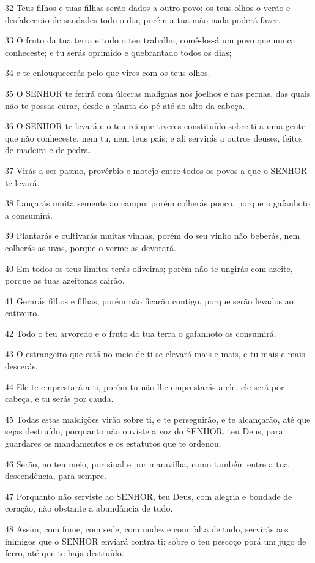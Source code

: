 \par 32 Teus filhos e tuas filhas serão dados a outro povo; os teus olhos o verão e desfalecerão de saudades todo o dia; porém a tua mão nada poderá fazer.
\par 33 O fruto da tua terra e todo o teu trabalho, comê-los-á um povo que nunca conheceste; e tu serás oprimido e quebrantado todos os dias;
\par 34 e te enlouquecerás pelo que vires com os teus olhos.
\par 35 O SENHOR te ferirá com úlceras malignas nos joelhos e nas pernas, das quais não te possas curar, desde a planta do pé até ao alto da cabeça.
\par 36 O SENHOR te levará e o teu rei que tiveres constituído sobre ti a uma gente que não conheceste, nem tu, nem teus pais; e ali servirás a outros deuses, feitos de madeira e de pedra.
\par 37 Virás a ser pasmo, provérbio e motejo entre todos os povos a que o SENHOR te levará.
\par 38 Lançarás muita semente ao campo; porém colherás pouco, porque o gafanhoto a consumirá.
\par 39 Plantarás e cultivarás muitas vinhas, porém do seu vinho não beberás, nem colherás as uvas, porque o verme as devorará.
\par 40 Em todos os teus limites terás oliveiras; porém não te ungirás com azeite, porque as tuas azeitonas cairão.
\par 41 Gerarás filhos e filhas, porém não ficarão contigo, porque serão levados ao cativeiro.
\par 42 Todo o teu arvoredo e o fruto da tua terra o gafanhoto os consumirá.
\par 43 O estrangeiro que está no meio de ti se elevará mais e mais, e tu mais e mais descerás.
\par 44 Ele te emprestará a ti, porém tu não lhe emprestarás a ele; ele será por cabeça, e tu serás por cauda.
\par 45 Todas estas maldições virão sobre ti, e te perseguirão, e te alcançarão, até que sejas destruído, porquanto não ouviste a voz do SENHOR, teu Deus, para guardares os mandamentos e os estatutos que te ordenou.
\par 46 Serão, no teu meio, por sinal e por maravilha, como também entre a tua descendência, para sempre.
\par 47 Porquanto não serviste ao SENHOR, teu Deus, com alegria e bondade de coração, não obstante a abundância de tudo.
\par 48 Assim, com fome, com sede, com nudez e com falta de tudo, servirás aos inimigos que o SENHOR enviará contra ti; sobre o teu pescoço porá um jugo de ferro, até que te haja destruído.
